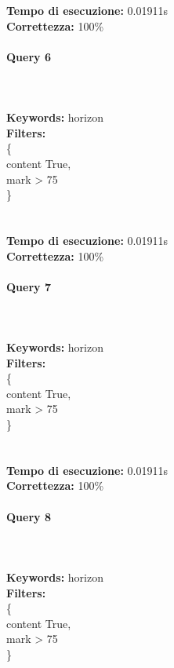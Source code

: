 \documentclass[12pt]{article}
\begin{document}
\noindent
\textbf{Tempo di esecuzione:} 0.01911s \\
\textbf{Correttezza:} 100\% \pagebreak

\paragraph{Query 6} ~ \\ \\

\noindent \textbf{Keywords: } horizon \\
\textbf{Filters: } \\
\indent \{ \\
\indent \indent content True, \\
\indent \indent mark > 75 \\
\indent \} \\\\\\


\noindent
\textbf{Tempo di esecuzione:} 0.01911s \\
\textbf{Correttezza:} 100\% \pagebreak

\paragraph{Query 7} ~ \\ \\

\noindent \textbf{Keywords: } horizon \\
\textbf{Filters: } \\
\indent \{ \\
\indent \indent content True, \\
\indent \indent mark > 75 \\
\indent \} \\\\\\


\noindent
\textbf{Tempo di esecuzione:} 0.01911s \\
\textbf{Correttezza:} 100\% \pagebreak

\paragraph{Query 8} ~ \\ \\

\noindent \textbf{Keywords: } horizon \\
\textbf{Filters: } \\
\indent \{ \\
\indent \indent content True, \\
\indent \indent mark > 75 \\
\indent \} \\\\\\
\end{document}
